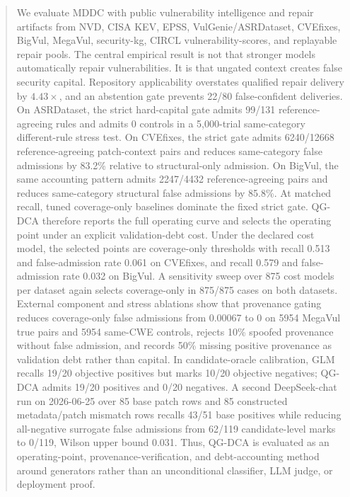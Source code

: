 ﻿\documentclass[lettersize,journal]{IEEEtran}
\begin{document}
\begin{abstract}
We evaluate MDDC with public vulnerability intelligence and repair artifacts from NVD, CISA KEV, EPSS, VulGenie/ASRDataset, CVEfixes, BigVul, MegaVul, security-kg, CIRCL vulnerability-scores, and replayable repair pools. The central empirical result is not that stronger models automatically repair vulnerabilities. It is that ungated context creates false security capital. Repository applicability overstates qualified repair delivery by $4.43\times$, and an abstention gate prevents 22/80 false-confident deliveries. On ASRDataset, the strict hard-capital gate admits 99/131 reference-agreeing rules and admits 0 controls in a 5,000-trial same-category different-rule stress test. On CVEfixes, the strict gate admits 6240/12668 reference-agreeing patch-context pairs and reduces same-category false admissions by 83.2\% relative to structural-only admission. On BigVul, the same accounting pattern admits 2247/4432 reference-agreeing pairs and reduces same-category structural false admissions by 85.8\%. At matched recall, tuned coverage-only baselines dominate the fixed strict gate. QG-DCA therefore reports the full operating curve and selects the operating point under an explicit validation-debt cost. Under the declared cost model, the selected points are coverage-only thresholds with recall 0.513 and false-admission rate 0.061 on CVEfixes, and recall 0.579 and false-admission rate 0.032 on BigVul. A sensitivity sweep over 875 cost models per dataset again selects coverage-only in 875/875 cases on both datasets. External component and stress ablations show that provenance gating reduces coverage-only false admissions from 0.00067 to 0 on 5954 MegaVul true pairs and 5954 same-CWE controls, rejects 10\% spoofed provenance without false admission, and records 50\% missing positive provenance as validation debt rather than capital. In candidate-oracle calibration, GLM recalls 19/20 objective positives but marks 10/20 objective negatives; QG-DCA admits 19/20 positives and 0/20 negatives. A second DeepSeek-chat run on 2026-06-25 over 85 base patch rows and 85 constructed metadata/patch mismatch rows recalls 43/51 base positives while reducing all-negative surrogate false admissions from 62/119 candidate-level marks to 0/119, Wilson upper bound 0.031. Thus, QG-DCA is evaluated as an operating-point, provenance-verification, and debt-accounting method around generators rather than an unconditional classifier, LLM judge, or deployment proof.


\end{abstract}
\end{document}
